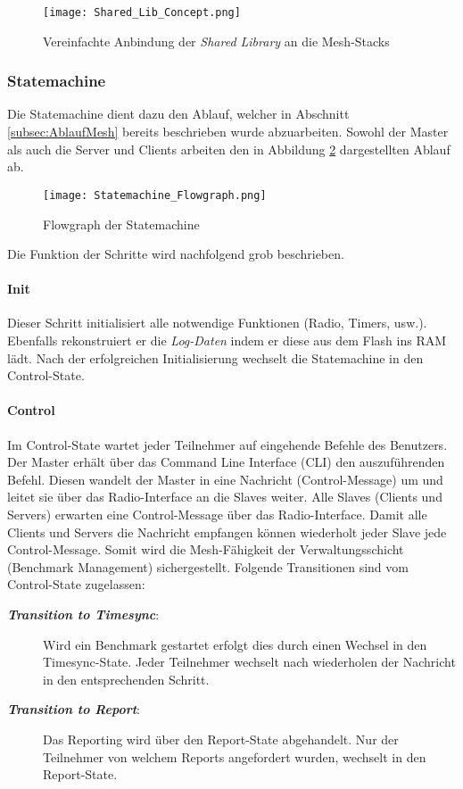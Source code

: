 \begin{figure}[H]
	\centering
	\texttt{[image: Shared\_Lib\_Concept.png]}
	\caption{Vereinfachte Anbindung der \textit{Shared Library} an die Mesh-Stacks}\label{fig:ShardeLibConcept}
\end{figure}


\subsubsection{Statemachine}\label{subsubsec:StatemachineSoftware}

Die Statemachine dient dazu den Ablauf, welcher in Abschnitt \ref{subsec:AblaufMesh} bereits beschrieben wurde abzuarbeiten. Sowohl der Master als auch die Server und Clients arbeiten den in Abbildung \ref{fig:StatemachineFLowgraph} dargestellten Ablauf ab. 

\begin{figure}[H]
	\centering
	\texttt{[image: Statemachine\_Flowgraph.png]}
	\caption{Flowgraph der Statemachine}\label{fig:StatemachineFLowgraph}
\end{figure}


Die Funktion der Schritte wird nachfolgend grob beschrieben.
\paragraph{Init}
	Dieser Schritt initialisiert alle notwendige Funktionen (Radio, Timers, usw.). Ebenfalls rekonstruiert er die \textit{Log-Daten} indem er diese aus dem Flash ins RAM lädt. Nach der erfolgreichen Initialisierung wechselt die Statemachine in den Control-State.
	
\paragraph{Control}
	Im Control-State wartet jeder Teilnehmer auf eingehende Befehle des Benutzers. Der Master erhält über das Command Line Interface (CLI) den auszuführenden Befehl.
	Diesen wandelt der Master in eine Nachricht (Control-Message) um und leitet sie über das Radio-Interface an die Slaves weiter. 
	Alle Slaves (Clients und Servers) erwarten eine Control-Message über das Radio-Interface.
	Damit alle Clients und Servers die Nachricht empfangen können wiederholt jeder Slave jede Control-Message.
	Somit wird die Mesh-Fähigkeit der Verwaltungsschicht (Benchmark Management) sichergestellt.
	Folgende Transitionen sind vom Control-State zugelassen: 
\begin{description}
	\item[\textit{\textbf{Transition to Timesync}}:]
	Wird ein Benchmark gestartet erfolgt dies durch einen Wechsel in den Timesync-State. Jeder Teilnehmer wechselt nach wiederholen der Nachricht in den entsprechenden Schritt. 
	\item[\textit{\textbf{Transition to Report}}:]
	Das Reporting wird über den Report-State abgehandelt. Nur der Teilnehmer von welchem Reports angefordert wurden, wechselt in den Report-State. 
\end{description} 	
	
